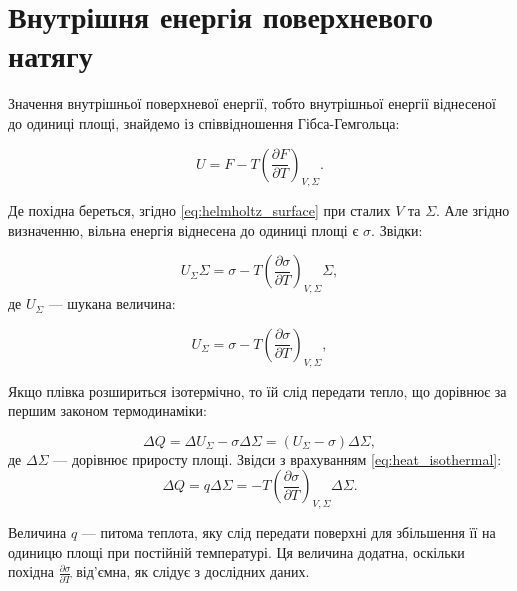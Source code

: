 \section{Внутрішня енергія поверхневого натягу}

Значення внутрішньої поверхневої енергії, тобто внутрішньої енергії віднесеної до одиниці площі, знайдемо із співвідношення Гібса-Гемгольца:

\begin{equation}
    U = F - T \left( \frac{\partial F}{\partial T} \right)_{V,\Sigma}.
    \label{eq:gibbs_helmholtz}
\end{equation}

Де похідна береться, згідно \eqref{eq:helmholtz_surface} при сталих $V$ та $\Sigma$. Але згідно визначенню, вільна енергія віднесена до одиниці площі є $\sigma$. Звідки:

\begin{equation}
    U_{\Sigma}\Sigma = \sigma - T \left( \frac{\partial \sigma}{\partial T} \right)_{V,\Sigma} \Sigma,
    \label{eq:surface_energy}
\end{equation}
де $U_{\Sigma}$ --- шукана величина:

\begin{equation}
    U_{\Sigma} = \sigma - T \left( \frac{\partial \sigma}{\partial T} \right)_{V,\Sigma},
\end{equation}

Якщо плівка розшириться ізотермічно, то їй слід передати тепло, що дорівнює за першим законом термодинаміки:

\begin{equation}
    \Delta Q = \Delta U_{\Sigma} - \sigma \Delta\Sigma = (U_{\Sigma} - \sigma) \Delta\Sigma,
    \label{eq:heat_isothermal}
\end{equation}
де $\Delta \Sigma$ --- дорівнює приросту площі. Звідси з врахуванням \eqref{eq:heat_isothermal}:
\begin{equation}
    \Delta Q = q\Delta\Sigma = - T \left( \frac{\partial \sigma}{\partial T} \right)_{V,\Sigma} \Delta\Sigma.
\end{equation}

Величина $q$ --- питома теплота, яку слід передати поверхні для збільшення її на одиницю площі при постійній температурі. Ця величина додатна, оскільки похідна $\frac{\partial \sigma}{\partial T}$ від’ємна, як слідує з дослідних даних.

